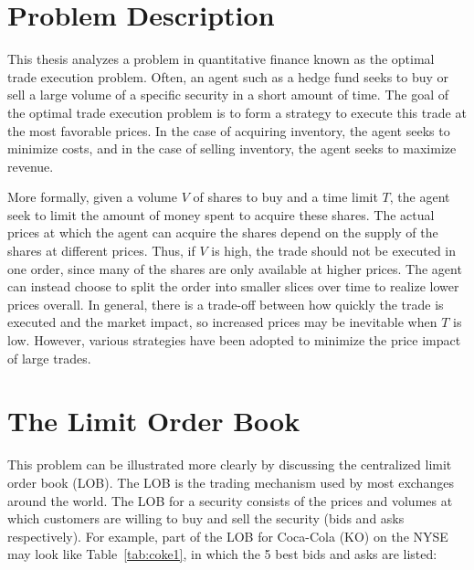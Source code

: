 \section{Problem Description} \label{ch:problemdescription}

This thesis analyzes a problem in quantitative finance known as the optimal trade execution problem. Often, an agent such as a hedge fund seeks to buy or sell a large volume of a specific security in a short amount of time. The goal of the optimal trade execution problem is to form a strategy to execute this trade at the most favorable prices. In the case of acquiring inventory, the agent seeks to minimize costs, and in the case of selling inventory, the agent seeks to maximize revenue.

More formally, given a volume $V$ of shares to buy and a time limit $T$, the agent seek to limit the amount of money spent to acquire these shares. The actual prices at which the agent can acquire the shares depend on the supply of the shares at different prices. Thus, if $V$ is high, the trade should not be executed in one order, since many of the shares are only available at higher prices. The agent can instead choose to split the order into smaller slices over time to realize lower prices overall. In general, there is a trade-off between how quickly the trade is executed and the market impact, so increased prices may be inevitable when $T$ is low. However, various strategies have been adopted to minimize the price impact of large trades.

\section{The Limit Order Book} \label{ch:background}
This problem can be illustrated more clearly by discussing the centralized limit order book (LOB). The LOB is the trading mechanism used by most exchanges around the world. The LOB for a security consists of the prices and volumes at which customers are willing to buy and sell the security (bids and asks respectively). For example, part of the LOB for Coca-Cola (KO) on the NYSE may look like Table~\ref{tab:coke1}, in which the 5 best bids and asks are listed:

